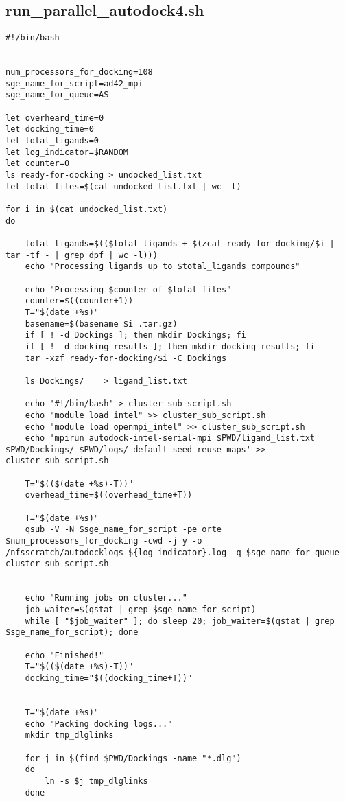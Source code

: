 \subsection{run\_parallel\_autodock4.sh}
\begin{changemargin}{-0.5in}{0in}


\begin{lstlisting}
#!/bin/bash


num_processors_for_docking=108
sge_name_for_script=ad42_mpi
sge_name_for_queue=AS

let overheard_time=0
let docking_time=0
let total_ligands=0
let log_indicator=$RANDOM
let counter=0
ls ready-for-docking > undocked_list.txt
let total_files=$(cat undocked_list.txt | wc -l)

for i in $(cat undocked_list.txt)
do

	total_ligands=$(($total_ligands + $(zcat ready-for-docking/$i | tar -tf - | grep dpf | wc -l)))
	echo "Processing ligands up to $total_ligands compounds"

	echo "Processing $counter of $total_files"
	counter=$((counter+1))
	T="$(date +%s)"
	basename=$(basename $i .tar.gz)
	if [ ! -d Dockings ]; then mkdir Dockings; fi
	if [ ! -d docking_results ]; then mkdir docking_results; fi
	tar -xzf ready-for-docking/$i -C Dockings

	ls Dockings/	> ligand_list.txt

	echo '#!/bin/bash' > cluster_sub_script.sh
	echo "module load intel" >> cluster_sub_script.sh
	echo "module load openmpi_intel" >> cluster_sub_script.sh
	echo 'mpirun autodock-intel-serial-mpi $PWD/ligand_list.txt $PWD/Dockings/ $PWD/logs/ default_seed reuse_maps' >> cluster_sub_script.sh

	T="$(($(date +%s)-T))"
	overhead_time=$((overhead_time+T))

	T="$(date +%s)"
	qsub -V -N $sge_name_for_script -pe orte $num_processors_for_docking -cwd -j y -o /nfsscratch/autodocklogs-${log_indicator}.log -q $sge_name_for_queue cluster_sub_script.sh

	
	echo "Running jobs on cluster..."
	job_waiter=$(qstat | grep $sge_name_for_script)
	while [ "$job_waiter" ]; do sleep 20; job_waiter=$(qstat | grep $sge_name_for_script); done
	
	echo "Finished!"
	T="$(($(date +%s)-T))"
	docking_time="$((docking_time+T))"


	T="$(date +%s)"
	echo "Packing docking logs..."
	mkdir tmp_dlglinks

	for j in $(find $PWD/Dockings -name "*.dlg")
	do
		ln -s $j tmp_dlglinks
	done


\end{lstlisting}
\end{changemargin}
